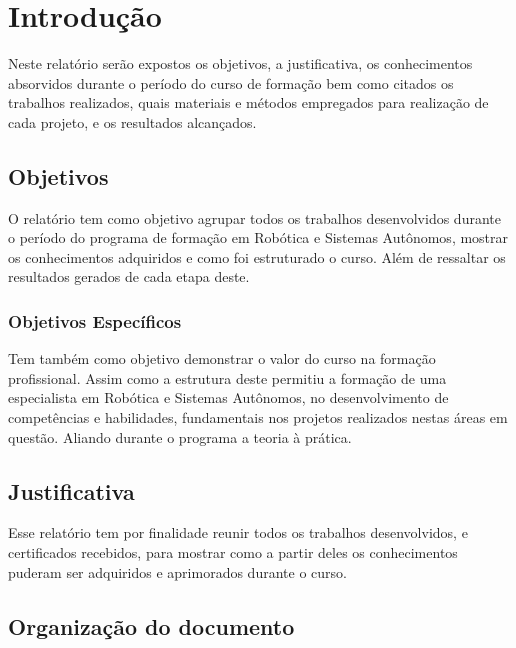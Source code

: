 \chapter{Introdução}
\label{chap:intro}

Neste relatório serão expostos os objetivos, a justificativa,  os conhecimentos absorvidos durante o período do curso de formação bem como citados os trabalhos realizados, quais materiais e métodos empregados para realização de cada projeto, e os resultados alcançados.

\section{Objetivos}
\label{sec:obj}

O relatório tem como objetivo agrupar todos os trabalhos desenvolvidos durante o período do programa de formação em Robótica e Sistemas Autônomos, mostrar os conhecimentos adquiridos e como foi estruturado o curso.
Além de ressaltar os resultados gerados de cada etapa deste.


\subsection{Objetivos Específicos}
\label{ssec:objesp}

Tem também como objetivo demonstrar o valor do curso na formação profissional. Assim como a estrutura deste permitiu a formação de uma especialista em Robótica e Sistemas Autônomos, no desenvolvimento de competências e habilidades, fundamentais nos projetos realizados nestas áreas em questão. Aliando durante o programa a teoria à prática. 



\section{Justificativa}
\label{sec:justi}

Esse relatório tem por finalidade reunir todos os trabalhos desenvolvidos, e certificados recebidos, para mostrar como a partir deles os conhecimentos puderam ser adquiridos e aprimorados durante o curso. 





\section{Organização do documento}
\label{section:organizacao}

